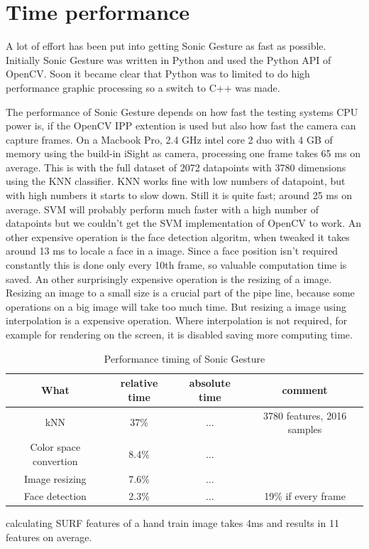 \section{Time performance}
A lot of effort has been put into getting Sonic Gesture as fast as possible. Initially Sonic Gesture was written in Python and used the Python API of OpenCV. Soon it became clear that Python was to limited to do high performance graphic processing so a switch to C++ was made. 

The performance of Sonic Gesture depends on how fast the testing systems CPU power is, if the OpenCV IPP extention is used but also how fast the camera can capture frames. On a Macbook Pro, 2.4 GHz intel core 2 duo with 4 GB of memory using the build-in iSight as camera, processing one frame takes 65 ms on average. This is with the full dataset of 2072 datapoints with 3780 dimensions using the KNN classifier. KNN works fine with low numbers of datapoint, but with high numbers it starts to slow down. Still it is quite fast; around 25 ms on average. SVM will probably perform much faster with a high number of datapoints but we couldn't get the SVM implementation of OpenCV to work. An other expensive operation is the face detection algoritm, when tweaked it takes around 13 ms to locale a face in a image. Since a face position isn't required constantly this is done only every 10th frame, so valuable computation time is saved. An other surprisingly expensive operation is the resizing of a image. Resizing an image to a small size is a crucial part of the pipe line, because some operations on a big image will take too much time. But resizing a image using interpolation is a expensive operation. Where interpolation is not required, for example for rendering on the screen, it is disabled saving more computing time. 



\begin{table}
\centering
\begin{tabular}{cccc}
What & relative time & absolute time & comment \\
\hline
kNN & 37\% & ... & 3780 features, 2016 samples \\
Color space convertion & 8.4\% & ... & \\
Image resizing & 7.6\% & ... & \\
Face detection & 2.3\% & ... &  19\% if every frame \\
\end{tabular}
\caption{Performance timing of Sonic Gesture}
\end{table}

calculating SURF features of a hand train image takes 4ms and results in 11 features on average.